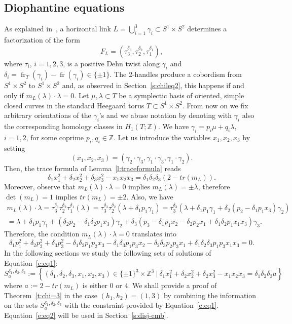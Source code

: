 \documentclass[11pt,a4paper]{amsart}
\newcommand{\Z}{\mathbb Z}
\newcommand{\de}{\delta}
\newcommand{\ga}{\gamma}
\newcommand{\la}{\lambda}
\newcommand{\x}{\times}
\DeclareMathOperator{\fr}{fr}
\newcommand{\tr}{tr}
\theoremstyle{definition}
\numberwithin{equation}{section}
\begin{document}
\subsection{Diophantine equations}\label{ss:equations} 
As explained in~\cite[\S 1]{LP22-2}, a horizontal link 
$L = \bigcup_{i=1}^3 \ga_i\subset S^1\x S^2$ determines a factorization of the form
\[
F_L=(\tau_3^{\de_3},\tau_2^{\de_2},\tau_1^{\de_1}), 
\]
where $\tau_i$, $i=1,2,3$, is a positive Dehn twist along $\ga_i$ and $\de_i = \fr_T(\ga_i) - \fr(\ga_i)\in\{\pm 1\}$. 
The 2-handles produce a cobordism from $S^1 \times S^2$ to $S^1 \times S^2$ and, 
as observed in Section~\ref{s:chileq2},  
this happens if and only if $m_L(\la)\cdot \la =0$. 
Let $\mu,\la\subset T$ be a symplectic basis of oriented, simple closed curves in the standard Heegaard torus $T\subset S^1\x S^2$. 
From now on we fix arbitrary orientations of the $\ga_i$'s and we abuse notation 
by denoting with $\ga_i$ also the corresponding homology classes in $H_1(T;\Z)$.
We have $\ga_i = p_i\mu + q_i\la$, $i=1,2$, for some coprime $p_i, q_i\in\Z$. 
Let us introduce the variables $x_1,x_2,x_3$ by setting 
\begin{equation}\label{e:relations1}
(x_1,x_2,x_3) = (\ga_2\cdot\ga_3, \ga_1\cdot\ga_3,\ga_1\cdot\ga_2). 
\end{equation} 
Then, the trace formula of Lemma~\ref{l:traceformula} reads 
\begin{equation}\label{e:eq1}
\de_1 x_1^2 + \de_2 x_2^2 + \de_3 x_3^2 -  x_1 x_2 x_3 = \de_1\de_2\de_3 (2 - \tr(m_L)).
\end{equation} 
Moreover, observe that $m_L(\la)\cdot \la =0$ implies $m_L(\la) = \pm \la$, therefore 
$\det(m_L) = 1$ implies $\tr(m_L) = \pm 2$. Also, we have 
\begin{multline*}
m_L(\la)\cdot \la = \tau_3^{\de_3}\tau_2^{\de_2}\tau_1^{\de_1}(\la) = 
\tau_3^{\de_3}\tau_2^{\de_2}(\la + \de_1 p_1\ga_1) = 
\tau_3^{\de_3}(\la + \de_1 p_1\ga_1 + \de_2(p_2 - \de_1 p_1 x_3)\ga_2) \\ 
= \la + \de_1 p_1\ga_1 + (\de_2 p_2 - \de_1\de_2 p_1 x_3)\ga_2 + 
\de_3(p_3 - \de_1 p_1 x_2 - \de_2 p_2 x_1 + \de_1\de_2 p_1 x_1 x_3)\ga_3.
\end{multline*}
Therefore, the condition $m_L(\la)\cdot \la =0$ translates into 
\begin{equation}\label{e:eq2}
\de_1 p^2_1 + \de_2 p^2_2 + \de_3 p^2_3
- \de_1\de_2 p_1 p_2 x_3 - \de_1 \de_3 p_1 p_3 x_2 - \de_2 \de_3 p_2 p_3 x_1 + \de_1\de_2\de_3 p_1 p_3 x_1 x_3 =0.
\end{equation} 
In the following sections we study the following sets of solutions of Equation~\eqref{e:eq1}:
\[
S_a^{\de_1,\de_2,\de_3}:=
\left\{
(\de_1,\de_2,\de_3,x_1,x_2,x_3) \in \{ \pm 1\}^3 \times \mathbb{Z}^3 
\ | \ \de_1 x_1^2 + \de_2 x_2^2 + \de_2 x_3^2 -  x_1 x_2 x_3 = \de_1\de_2\de_3 a
\right\}
\]
where $a:=2-\tr(m_L)$ is either $0$ or $4$. 
We shall provide a proof of Theorem~\ref{t:chi=3} in the case $(h_1,h_2)=(1,3)$ by combining 
the information on the sets $S_a^{\de_1,\de_2,\de_3}$ with the constraint provided by Equation~\eqref{e:eq1}. 
Equation~\eqref{e:eq2} will be used in Section~\ref{s:disj-emb}.
\end{document}
